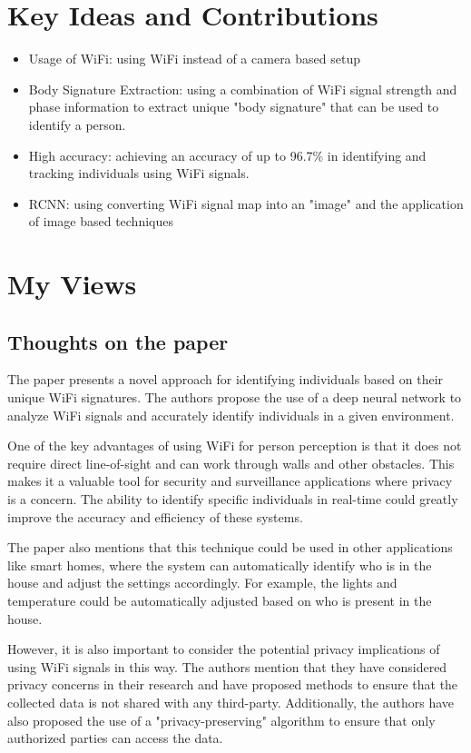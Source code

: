 \documentclass{article}
\begin{document}
\section{Key Ideas and Contributions}
\label{sec:ideas}
\begin{itemize}
    \item Usage of WiFi: using WiFi instead of a camera based setup
    \item Body Signature Extraction: using a combination of WiFi signal strength and phase information to extract unique "body signature" that can be used to identify a person.
    \item High accuracy: achieving an accuracy of up to 96.7\% in identifying and tracking individuals using WiFi signals.
    \item RCNN: using converting WiFi signal map into an "image" and the application of image based techniques
\end{itemize}


\section{My Views}
\label{sec:personal_views}

\subsection{Thoughts on the paper}
The paper presents a novel approach for identifying individuals based on their unique WiFi signatures. The authors propose the use of a deep neural network to analyze WiFi signals and accurately identify individuals in a given environment.

One of the key advantages of using WiFi for person perception is that it does not require direct line-of-sight and can work through walls and other obstacles. This makes it a valuable tool for security and surveillance applications where privacy is a concern. The ability to identify specific individuals in real-time could greatly improve the accuracy and efficiency of these systems.

The paper also mentions that this technique could be used in other applications like smart homes, where the system can automatically identify who is in the house and adjust the settings accordingly. For example, the lights and temperature could be automatically adjusted based on who is present in the house.

However, it is also important to consider the potential privacy implications of using WiFi signals in this way. The authors mention that they have considered privacy concerns in their research and have proposed methods to ensure that the collected data is not shared with any third-party. Additionally, the authors have also proposed the use of a "privacy-preserving" algorithm to ensure that only authorized parties can access the data.
\end{document}
